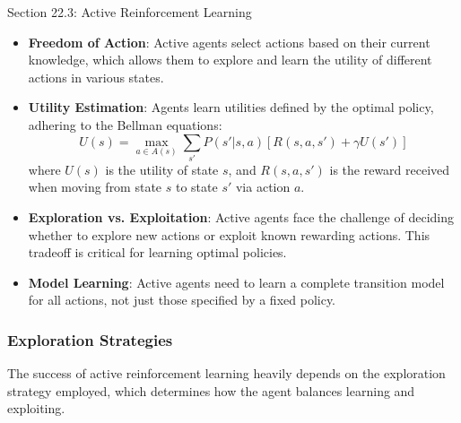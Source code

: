 \begin{notes}{Section 22.3: Active Reinforcement Learning}
\begin{highlight}
        \begin{itemize}
            \item \textbf{Freedom of Action}: Active agents select actions based on their current knowledge, which allows them to explore and learn the utility of different actions in various states.
            \item \textbf{Utility Estimation}: Agents learn utilities defined by the optimal policy, adhering to the Bellman equations:
            \[
            U(s) = \max_{a \in A(s)} \sum_{s'} P(s' | s, a) [R(s, a, s') + \gamma U(s')]
            \]
            where $U(s)$ is the utility of state $s$, and $R(s, a, s')$ is the reward received when moving from state $s$ to state $s'$ via action $a$.
            \item \textbf{Exploration vs. Exploitation}: Active agents face the challenge of deciding whether to explore new actions or exploit known rewarding actions. This tradeoff is critical for learning 
            optimal policies.
            \item \textbf{Model Learning}: Active agents need to learn a complete transition model for all actions, not just those specified by a fixed policy.
        \end{itemize}
    
    \end{highlight}
    
    \subsubsection*{Exploration Strategies}
    
    The success of active reinforcement learning heavily depends on the exploration strategy employed, which determines how the agent balances learning and exploiting.
    
    \begin{highlight}
    

\end{highlight}
\end{notes}
